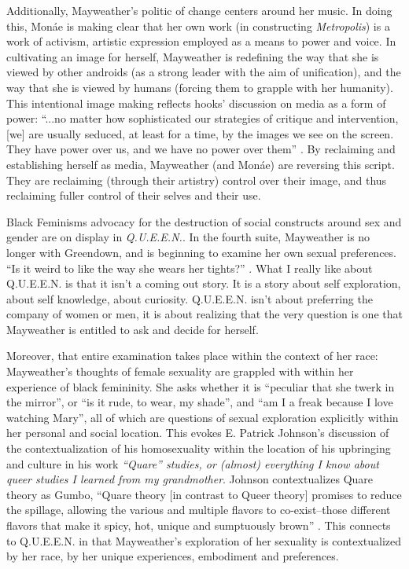 \documentclass[a4paper, 11pt]{article} %
\begin{document}
Additionally, Mayweather's politic of change centers around her music.
In doing this, Mon\'ae is making clear that her own work (in constructing \emph{Metropolis}) is a work of activism, artistic expression employed as a means to power and voice.
In cultivating an image for herself, Mayweather is redefining the way that she is viewed by other androids (as a strong leader with the aim of unification), and the way that she is viewed by humans (forcing them to grapple with her humanity).
This intentional image making reflects hooks' discussion on media as a form of power: ``...no matter how sophisticated our strategies of critique and intervention, [we] are usually seduced, at least for a time, by the images we see on the screen. They have power over us, and we have no power over them'' .
By reclaiming and establishing herself as media, Mayweather (and Mon\'ae) are reversing this script.
They are reclaiming (through their artistry) control over their image, and thus reclaiming fuller control of their selves and their use.

Black Feminisms advocacy for the destruction of social constructs around sex and gender are on display in \emph{Q.U.E.E.N.}.
In the fourth suite, Mayweather is no longer with Greendown, and is beginning to examine her own sexual preferences.
``Is it weird to like the way she wears her tights?'' .
What I really like about Q.U.E.E.N. is that it isn't a coming out story.
It is a story about self exploration, about self knowledge, about curiosity. 
Q.U.E.E.N. isn't about preferring the company of women or men, it is about realizing that the very question is one that Mayweather is entitled to ask and decide for herself.

Moreover, that entire examination takes place within the context of her race: Mayweather's thoughts of female sexuality are grappled with within her experience of black femininity.
She asks whether it is ``peculiar that she twerk in the mirror'', or ``is it rude, to wear, my shade'', and ``am I a freak because I love watching Mary'', all of which are questions of sexual exploration explicitly within her personal and social location.
This evokes E. Patrick Johnson's discussion of the contextualization of his homosexuality within the location of his upbringing and culture in his work \emph{``Quare'' studies, or (almost) everything I know about queer studies I learned from my grandmother}.
Johnson contextualizes Quare theory as Gumbo, 
``Quare theory [in contrast to Queer theory] promises to  reduce the spillage, allowing the various and multiple flavors to co-exist--those different flavors that make it spicy, hot, unique and sumptuously brown'' .
This connects to Q.U.E.E.N. in that Mayweather's exploration of her sexuality is contextualized by her race, by her unique experiences, embodiment and preferences. 
\end{document}

